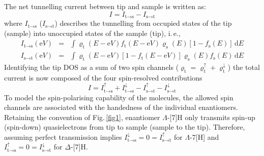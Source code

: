 \documentclass[aps,floatfix,12pt]{revtex4-2}
\begin{document}
The net tunnelling current between tip and sample is written as:
\begin{equation}
I=I_{\text{t}\rightarrow\text{s}}-I_{\text{s}\rightarrow\text{t}}
\end{equation}
where $I_{\text{t}\rightarrow\text{s}}$ ($I_{\text{s}\rightarrow\text{t}}$)  describes the tunnelling from occupied states of the tip (sample) into unoccupied states of the sample (tip), i.\,e.,
\begin{eqnarray}
I_{\text{t}\rightarrow\text{s}}(\text{e}V)&=&\int\varrho_\text{t}(E-\text{e}V)f_\text{t}(E-\text{e}V)\varrho_\text{s}(E)[1-f_\text{s}(E)]\,\text{d}E \\
I_{\text{s}\rightarrow\text{t}}(\text{e}V)&=&\int\varrho_\text{t}(E-\text{e}V)[1-f_\text{t}(E-\text{e}V)]\varrho_\text{s}(E)f_\text{s}(E)\,\text{d}E
\end{eqnarray}
Identifying the tip DOS as a sum of two spin channels ($\varrho_\text{t}=\varrho^{\uparrow}_\text{t}+\varrho^{\downarrow}_\text{t}$) the total current is now composed of the four spin-resolved contributions
\begin{equation}
I=I^{\uparrow}_{\text{t}\rightarrow\text{s}}+I^{\downarrow}_{\text{t}\rightarrow\text{s}}-I^{\uparrow}_{\text{s}\rightarrow\text{t}}-I^{\downarrow}_{\text{s}\rightarrow\text{t}}
\end{equation}
To model the spin-polarising capability of the molecules, the allowed spin channels are associated with the handedness of the individual enantiomers.
Retaining the convention of Fig.\,\ref{fig1}, enantiomer $\Lambda$-[7]H only transmits spin-up (spin-down) quasielectrons from tip to sample (sample to the tip)\@.
Therefore, assuming perfect transmission implies $I^{\downarrow}_{\text{t}\rightarrow\text{s}}=0=I^{\uparrow}_{\text{s}\rightarrow\text{t}}$ for $\Lambda$-7[H] and $I^{\uparrow}_{\text{t}\rightarrow\text{s}}=0=I^{\downarrow}_{\text{s}\rightarrow\text{t}}$ for $\Delta$-[7]H\@.
\end{document}
